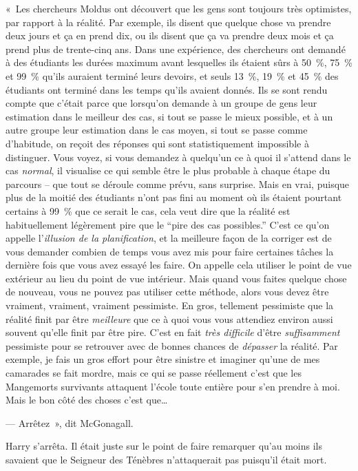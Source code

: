 «~Les chercheurs Moldus ont découvert que les gens sont toujours très optimistes, par rapport à la réalité.
Par exemple, ils disent que quelque chose va prendre deux jours et ça en prend dix, ou ils disent que ça va prendre deux mois et ça prend plus de trente-cinq ans.
Dans une expérience, des chercheurs ont demandé à des étudiants les durées maximum avant lesquelles ils étaient sûrs à 50~\%, 75~\% et 99~\% qu'ils auraient terminé leurs devoirs, et seuls 13~\%, 19~\% et 45~\% des étudiants ont terminé dans les temps qu'ils avaient donnés.
Ils se sont rendu compte que c'était parce que lorsqu'on demande à un groupe de gens leur estimation dans le meilleur des cas, si tout se passe le mieux possible, et à un autre groupe leur estimation dans le cas moyen, si tout se passe comme d'habitude, on reçoit des réponses qui sont statistiquement impossible à distinguer.
Vous voyez, si vous demandez à quelqu'un ce à quoi il s'attend dans le cas \emph{normal}, il visualise ce qui semble être le plus probable à chaque étape du parcours -- que tout se déroule comme prévu, sans surprise.
Mais en vrai, puisque plus de la moitié des étudiants n'ont pas fini au moment où ils étaient pourtant certains à 99~\% que ce serait le cas, cela veut dire que la réalité est habituellement légèrement pire que le “pire des cas possibles.”
C'est ce qu'on appelle l'\emph{illusion de la planification}, et la meilleure façon de la corriger est de vous demander combien de temps vous avez mis pour faire certaines tâches la dernière fois que vous avez essayé les faire.
On appelle cela utiliser le point de vue extérieur au lieu du point de vue intérieur.
Mais quand vous faites quelque chose de nouveau, vous ne pouvez pas utiliser cette méthode, alors vous devez être vraiment, vraiment, vraiment pessimiste.
En gros, tellement pessimiste que la réalité finit par être \emph{meilleure} que ce à quoi vous vous attendiez environ aussi souvent qu'elle finit par être pire.
C'est en fait \emph{très difficile} d'être \emph{suffisamment} pessimiste pour se retrouver avec de bonnes chances de \emph{dépasser} la réalité.
Par exemple, je fais un gros effort pour être sinistre et imaginer qu'une de mes camarades se fait mordre, mais ce qui se passe réellement c'est que les Mangemorts survivants attaquent l'école toute entière pour s'en prendre à moi. Mais le bon côté des choses c'est que…

--- Arrêtez~», dit McGonagall.

Harry s'arrêta. Il était juste sur le point de faire remarquer qu'au moins ils savaient que le Seigneur des Ténèbres n'attaquerait pas puisqu'il était mort.

